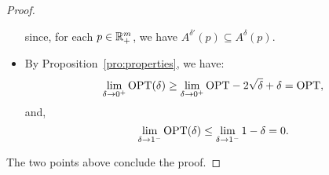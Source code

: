 \begin{proof}
\begin{itemize}
\begin{equation*}
		\end{equation*}
		since, for each $p \in \mathbb{R}^{m}_{+}$, we have ${A}^{\delta'}(p) \subseteq  {A}^{\delta}(p)$.
		\item By Proposition~\ref{pro:properties}, we have:
		\begin{equation*}
			\lim_{\delta \to 0^+}  \textnormal{OPT}(\delta) \ge \lim_{\delta \to 0^+}\textnormal{OPT} - 2 \sqrt{\delta} + \delta =\textnormal{OPT},
		\end{equation*}
		and,
		\begin{equation*}
			\lim_{\delta \to 1^-}  \textnormal{OPT}(\delta) \le \lim_{\delta \to 1^-}1-\delta =0.
		\end{equation*}
	\end{itemize}
	The two points above conclude the proof.
\end{proof}
%
\epsilonconvert*
